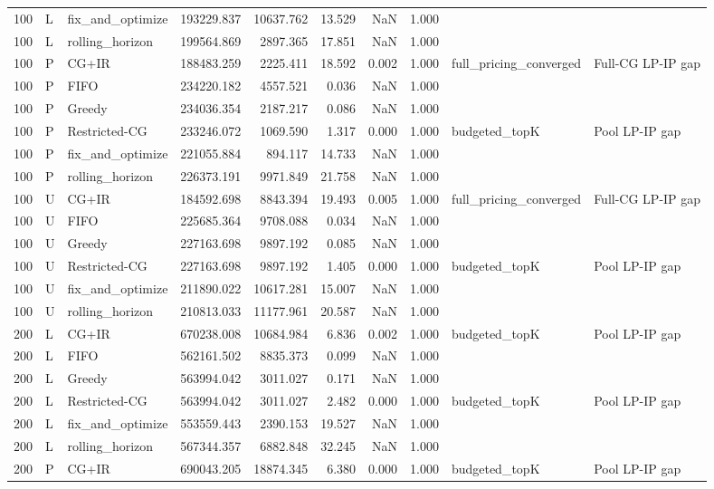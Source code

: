 \begin{tabular}{rllrrrrrll}
100 & L & fix_and_optimize & 193229.837 & 10637.762 & 13.529 & NaN & 1.000 &  &  \\
100 & L & rolling_horizon & 199564.869 & 2897.365 & 17.851 & NaN & 1.000 &  &  \\
100 & P & CG+IR & 188483.259 & 2225.411 & 18.592 & 0.002 & 1.000 & full_pricing_converged & Full-CG LP-IP gap \\
100 & P & FIFO & 234220.182 & 4557.521 & 0.036 & NaN & 1.000 &  &  \\
100 & P & Greedy & 234036.354 & 2187.217 & 0.086 & NaN & 1.000 &  &  \\
100 & P & Restricted-CG & 233246.072 & 1069.590 & 1.317 & 0.000 & 1.000 & budgeted_topK & Pool LP-IP gap \\
100 & P & fix_and_optimize & 221055.884 & 894.117 & 14.733 & NaN & 1.000 &  &  \\
100 & P & rolling_horizon & 226373.191 & 9971.849 & 21.758 & NaN & 1.000 &  &  \\
100 & U & CG+IR & 184592.698 & 8843.394 & 19.493 & 0.005 & 1.000 & full_pricing_converged & Full-CG LP-IP gap \\
100 & U & FIFO & 225685.364 & 9708.088 & 0.034 & NaN & 1.000 &  &  \\
100 & U & Greedy & 227163.698 & 9897.192 & 0.085 & NaN & 1.000 &  &  \\
100 & U & Restricted-CG & 227163.698 & 9897.192 & 1.405 & 0.000 & 1.000 & budgeted_topK & Pool LP-IP gap \\
100 & U & fix_and_optimize & 211890.022 & 10617.281 & 15.007 & NaN & 1.000 &  &  \\
100 & U & rolling_horizon & 210813.033 & 11177.961 & 20.587 & NaN & 1.000 &  &  \\
200 & L & CG+IR & 670238.008 & 10684.984 & 6.836 & 0.002 & 1.000 & budgeted_topK & Pool LP-IP gap \\
200 & L & FIFO & 562161.502 & 8835.373 & 0.099 & NaN & 1.000 &  &  \\
200 & L & Greedy & 563994.042 & 3011.027 & 0.171 & NaN & 1.000 &  &  \\
200 & L & Restricted-CG & 563994.042 & 3011.027 & 2.482 & 0.000 & 1.000 & budgeted_topK & Pool LP-IP gap \\
200 & L & fix_and_optimize & 553559.443 & 2390.153 & 19.527 & NaN & 1.000 &  &  \\
200 & L & rolling_horizon & 567344.357 & 6882.848 & 32.245 & NaN & 1.000 &  &  \\
200 & P & CG+IR & 690043.205 & 18874.345 & 6.380 & 0.000 & 1.000 & budgeted_topK & Pool LP-IP gap \\

\end{tabular}
